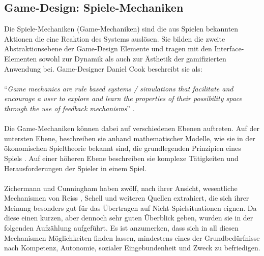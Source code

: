 \documentclass[a4paper,12pt,twoside]{scrartcl}
\begin{document}
\subsection{Game-Design: Spiele-Mechaniken}
\label{Spielmechaniken}
Die Spiele-Mechaniken (Game-Mechaniken) sind die aus Spielen bekannten Aktionen die eine Reaktion des Systems auslösen. Sie bilden die zweite Abstraktionsebene der Game-Design Elemente und tragen mit den Interface-Elementen sowohl zur Dynamik als auch zur Ästhetik der gamifizierten Anwendung bei. Game-Designer Daniel Cook beschreibt sie als:
\\\\
\enquote{\textit{Game mechanics are rule based systems / simulations that facilitate and encourage a user to explore and learn the properties of their possibility space through the use of feedback mechanisms}} \cite{GameMechanics2006}. 
\\\\
Die Game-Mechaniken können dabei auf verschiedenen Ebenen auftreten. Auf der untersten Ebene, beschreiben sie anhand mathematischer Modelle, wie sie in der ökonomischen Spieltheorie bekannt sind, die grundlegenden Prinzipien eines Spiels \cite{Schell2014}. Auf einer höheren Ebene beschreiben sie komplexe Tätigkeiten und Herausforderungen der Spieler in einem Spiel.
\\\\
Zichermann und Cunningham \cite{Zichermann2011} haben zwölf, nach ihrer Ansicht, wesentliche Mechanismen von Reiss \cite{Reiss2009}, Schell \cite{Schell2014} und weiteren Quellen extrahiert, die sich ihrer Meinung besonders gut für das Übertragen auf Nicht-Spielsituationen eignen. Da diese einen kurzen, aber dennoch sehr guten Überblick geben, wurden sie in der folgenden Aufzählung aufgeführt. Es ist anzumerken, dass sich in all diesen Mechanismen Möglichkeiten finden lassen, mindestens eines der Grundbedürfnisse nach Kompetenz, Autonomie, sozialer Eingebundenheit und Zweck zu befriedigen. 
\newpage    
\end{document}
